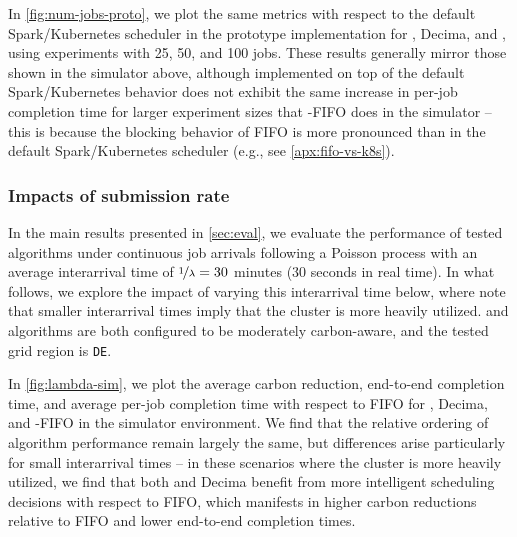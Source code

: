 In \autoref{fig:num-jobs-proto}, we plot the same metrics with respect to the default Spark/Kubernetes scheduler in the prototype implementation for \DANISH, Decima, and \CAP, using experiments with 25, 50, and 100 jobs.  These results generally mirror those shown in the simulator above, although \CAP implemented on top of the default Spark/Kubernetes behavior does not exhibit the same increase in per-job completion time for larger experiment sizes that \CAP-FIFO does in the simulator -- this is because the blocking behavior of FIFO is more pronounced than in the default Spark/Kubernetes scheduler (e.g., see \autoref{apx:fifo-vs-k8s}).


\subsubsection{\textbf{Impacts of submission rate}}
In the main results presented in \autoref{sec:eval}, we evaluate the performance of tested algorithms under continuous job arrivals following a Poisson process with an average interarrival time of $\nicefrac{1}{\lambda} = 30$ minutes ($30$ seconds in real time).  In what follows, we explore the impact of varying this interarrival time below, where note that smaller interarrival times imply that the cluster is more heavily utilized.  \DANISH and \CAP algorithms are both configured to be moderately carbon-aware, and the tested grid region is \verb|DE|.

In \autoref{fig:lambda-sim}, we plot the average carbon reduction, end-to-end completion time, and average per-job completion time with respect to FIFO for \DANISH, Decima, and \CAP-FIFO in the simulator environment.  We find that the relative ordering of algorithm performance remain largely the same, but differences arise particularly for small interarrival times -- in these scenarios where the cluster is more heavily utilized, we find that both \DANISH and Decima benefit from more intelligent scheduling decisions with respect to FIFO, which manifests in higher carbon reductions relative to FIFO and lower end-to-end completion times.


